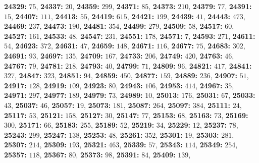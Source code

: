 \textsf{\bfseries 24329:} $75$, \textsf{\bfseries 24337:} $20$, \textsf{\bfseries 24359:} $299$, \textsf{\bfseries 24371:} $85$, \textsf{\bfseries 24373:} $210$, \textsf{\bfseries 24379:} $77$, \textsf{\bfseries 24391:} $15$, \textsf{\bfseries 24407:} $111$, \textsf{\bfseries 24413:} $55$, \textsf{\bfseries 24419:} $615$, \textsf{\bfseries 24421:} $199$, \textsf{\bfseries 24439:} $41$, \textsf{\bfseries 24443:} $473$, \textsf{\bfseries 24469:} $237$, \textsf{\bfseries 24473:} $190$, \textsf{\bfseries 24481:} $354$, \textsf{\bfseries 24499:} $279$, \textsf{\bfseries 24509:} $58$, \textsf{\bfseries 24517:} $60$, \textsf{\bfseries 24527:} $161$, \textsf{\bfseries 24533:} $48$, \textsf{\bfseries 24547:} $231$, \textsf{\bfseries 24551:} $178$, \textsf{\bfseries 24571:} $7$, \textsf{\bfseries 24593:} $271$, \textsf{\bfseries 24611:} $54$, \textsf{\bfseries 24623:} $372$, \textsf{\bfseries 24631:} $47$, \textsf{\bfseries 24659:} $148$, \textsf{\bfseries 24671:} $116$, \textsf{\bfseries 24677:} $75$, \textsf{\bfseries 24683:} $302$, \textsf{\bfseries 24691:} $93$, \textsf{\bfseries 24697:} $135$, \textsf{\bfseries 24709:} $167$, \textsf{\bfseries 24733:} $206$, \textsf{\bfseries 24749:} $420$, \textsf{\bfseries 24763:} $46$, \textsf{\bfseries 24767:} $79$, \textsf{\bfseries 24781:} $218$, \textsf{\bfseries 24793:} $40$, \textsf{\bfseries 24799:} $71$, \textsf{\bfseries 24809:} $96$, \textsf{\bfseries 24821:} $417$, \textsf{\bfseries 24841:} $327$, \textsf{\bfseries 24847:} $323$, \textsf{\bfseries 24851:} $94$, \textsf{\bfseries 24859:} $450$, \textsf{\bfseries 24877:} $159$, \textsf{\bfseries 24889:} $236$, \textsf{\bfseries 24907:} $51$, \textsf{\bfseries 24917:} $128$, \textsf{\bfseries 24919:} $109$, \textsf{\bfseries 24923:} $80$, \textsf{\bfseries 24943:} $106$, \textsf{\bfseries 24953:} $414$, \textsf{\bfseries 24967:} $35$, \textsf{\bfseries 24971:} $297$, \textsf{\bfseries 24977:} $189$, \textsf{\bfseries 24979:} $73$, \textsf{\bfseries 24989:} $10$, \textsf{\bfseries 25013:} $176$, \textsf{\bfseries 25031:} $67$, \textsf{\bfseries 25033:} $43$, \textsf{\bfseries 25037:} $46$, \textsf{\bfseries 25057:} $19$, \textsf{\bfseries 25073:} $181$, \textsf{\bfseries 25087:} $264$, \textsf{\bfseries 25097:} $384$, \textsf{\bfseries 25111:} $24$, \textsf{\bfseries 25117:} $53$, \textsf{\bfseries 25121:} $158$, \textsf{\bfseries 25127:} $30$, \textsf{\bfseries 25147:} $77$, \textsf{\bfseries 25153:} $68$, \textsf{\bfseries 25163:} $73$, \textsf{\bfseries 25169:} $300$, \textsf{\bfseries 25171:} $66$, \textsf{\bfseries 25183:} $255$, \textsf{\bfseries 25189:} $52$, \textsf{\bfseries 25219:} $34$, \textsf{\bfseries 25229:} $12$, \textsf{\bfseries 25237:} $78$, \textsf{\bfseries 25243:} $299$, \textsf{\bfseries 25247:} $138$, \textsf{\bfseries 25253:} $48$, \textsf{\bfseries 25261:} $352$, \textsf{\bfseries 25301:} $19$, \textsf{\bfseries 25303:} $281$, \textsf{\bfseries 25307:} $214$, \textsf{\bfseries 25309:} $193$, \textsf{\bfseries 25321:} $463$, \textsf{\bfseries 25339:} $57$, \textsf{\bfseries 25343:} $114$, \textsf{\bfseries 25349:} $254$, \textsf{\bfseries 25357:} $118$, \textsf{\bfseries 25367:} $80$, \textsf{\bfseries 25373:} $98$, \textsf{\bfseries 25391:} $84$, \textsf{\bfseries 25409:} $139$, 
